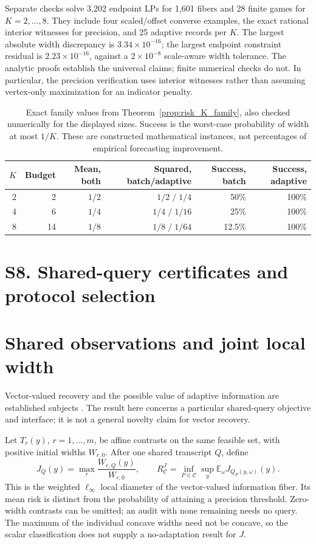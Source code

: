 Separate checks solve 3,202 endpoint LPs for 1,601 fibers and 28 finite
games for $K=2,\ldots,8$. They include four scaled/offset converse examples,
the exact rational interior witnesses for precision, and 25 adaptive
records per $K$. The largest absolute width discrepancy is
$3.34\times10^{-16}$; the largest endpoint constraint residual is
$2.23\times10^{-16}$, against a $2\times10^{-8}$ scale-aware width
tolerance. The analytic proofs establish the universal claims;
finite numerical checks do not. In particular, the precision verification
uses interior witnesses rather than assuming vertex-only maximization
for an indicator penalty.
\begin{table}[htbp]\centering\small
\caption{Exact family values from Theorem~\ref{prop:risk_K_family},
also checked numerically for the displayed sizes. Success is the worst-case
probability of width at most $1/K$. These are constructed mathematical
instances, not percentages of empirical forecasting improvement.}
\label{tab:family-values}
\begin{tabular}{rrrrrr}\toprule
$K$ & Budget & Mean, both & Squared, batch/adaptive & Success, batch & Success, adaptive\\\midrule
2 & 2 & $1/2$ & $1/2\; /\;1/4$ & 50\% & 100\%\\
4 & 6 & $1/4$ & $1/4\; /\;1/16$ & 25\% & 100\%\\
8 & 14 & $1/8$ & $1/8\; /\;1/64$ & 12.5\% & 100\%\\
\bottomrule\end{tabular}\end{table}
\FloatBarrier
\section{S8. Shared-query certificates and protocol selection}
\section{Shared observations and joint local width}
\label{app:joint-width-boundary}
Vector-valued recovery and the possible value of adaptive information are
established subjects \citep{krieg2025}. The result here concerns a particular
shared-query objective and interface; it is not a general novelty claim for
vector recovery.

Let $T_r(y)$, $r=1,\ldots,m$, be affine contrasts on the same feasible set,
with positive initial widths $W_{r,0}$. After one shared transcript $Q$, define
\[
 J_Q(y)=\max_r\frac{W_{r,Q}(y)}{W_{r,0}},\qquad
 R_{\mathcal C}^{J}=\inf_{P\in\mathcal C}\sup_y
                  \mathbb E_\omega J_{Q_P(y,\omega)}(y).
\]
This is the weighted $\ell_\infty$ local diameter of the vector-valued
information fiber. Its mean risk is distinct from the probability of
attaining a precision threshold. Zero-width contrasts can be omitted;
an audit with none remaining needs no query. The maximum of the individual
concave widths need not be concave, so the scalar classification does not
supply a no-adaptation result for $J$.


